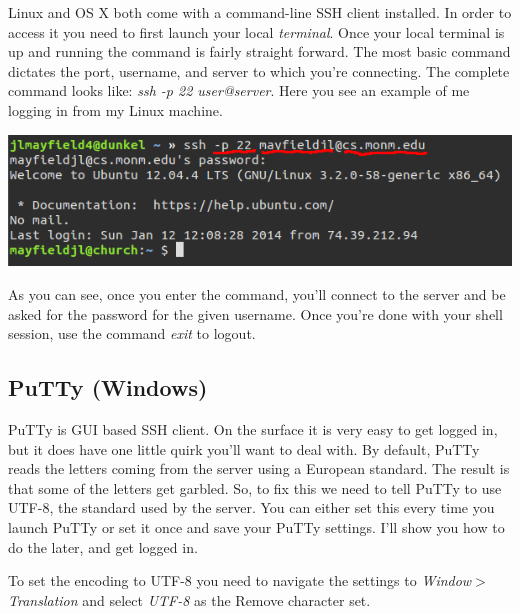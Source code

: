 \documentclass[]{tufte-handout}
\begin{document}
Linux and OS X both come with a command-line SSH client installed.  In order to access it you need to first launch your local \textit{terminal}. Once your local terminal is up and running the command is fairly straight forward. The most basic command dictates the port, username, and server to which you're connecting. The complete command looks like: \textit{ssh -p 22 user@server}.  Here you see an example of me logging in from my Linux machine.

\vspace{.1in}
\begin{center}
\includegraphics[scale=.5]{linux-sshlogin.png}
\end{center}
\vspace{.1in}

As you can see, once you enter the command, you'll connect to the server and be asked for the password for the given username. Once you're done with your shell session, use the command \textit{exit} to logout. 

\subsection{PuTTy (Windows)}

PuTTy is  GUI based SSH client.  On the surface it is very easy to get logged in, but it does have one little quirk you'll want to deal with. By default, PuTTy reads the letters coming from the server using a European standard.  The result is that some of the letters get garbled. So, to fix this we need to tell PuTTy to use UTF-8, the standard used by the server.  You can either set this every time you launch PuTTy or set it once and save your PuTTy settings. I'll show you how to do the later, and get logged in.  

To set the encoding to UTF-8 you need to navigate the settings to \textit{Window$>$Translation} and select \textit{UTF-8} as the Remove character set.
\end{document}
